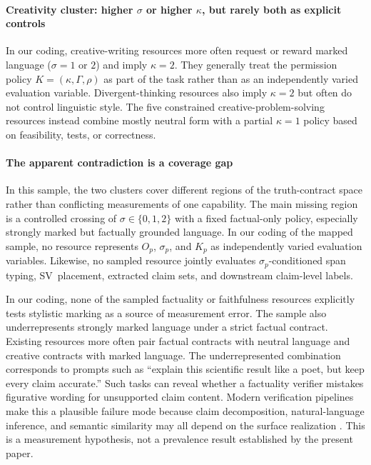 \documentclass{clv2025}
\newcommand{\SV}{\textsc{SV}}
\begin{document}
\paragraph{Creativity cluster: higher $\sigma$ or higher $\kappa$, but rarely both as explicit controls}
In our coding, creative-writing resources more often request or reward marked language ($\sigma=1$ or $2$) and imply $\kappa=2$.
They generally treat the permission policy $K=(\kappa,\Gamma,\rho)$ as part of the task rather than as an independently varied evaluation variable.
Divergent-thinking resources also imply $\kappa=2$ but often do not control linguistic style.
The five constrained creative-problem-solving resources instead combine mostly neutral form with a partial $\kappa=1$ policy based on feasibility, tests, or correctness.

\paragraph{The apparent contradiction is a coverage gap}
In this sample, the two clusters cover different regions of the truth-contract space rather than conflicting measurements of one capability.
The main missing region is a controlled crossing of $\sigma\in\{0,1,2\}$ with a fixed factual-only policy, especially strongly marked but factually grounded language.
In our coding of the mapped sample, no resource represents $O_p$, $\sigma_p$, and $K_p$ as independently varied evaluation variables.
Likewise, no sampled resource jointly evaluates $\sigma_p$-conditioned span typing, \SV\ placement, extracted claim sets, and downstream claim-level labels.

In our coding, none of the sampled factuality or faithfulness resources explicitly tests stylistic marking as a source of measurement error.
The sample also underrepresents strongly marked language under a strict factual contract.
Existing resources more often pair factual contracts with neutral language and creative contracts with marked language.
The underrepresented combination corresponds to prompts such as ``explain this scientific result like a poet, but keep every claim accurate.''
Such tasks can reveal whether a factuality verifier mistakes figurative wording for unsupported claim content.
Modern verification pipelines make this a plausible failure mode because claim decomposition, natural-language inference, and semantic similarity may all depend on the surface realization \citep{chen_menli_2023,aynetdinov_semscore_2024}.
This is a measurement hypothesis, not a prevalence result established by the present paper.
\end{document}
